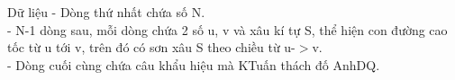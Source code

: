 Dữ liệu  
- Dòng thứ nhất chứa số N.   
\\   - N-1 dòng sau, mỗi dòng chứa 2 số u, v và xâu kí tự S, thể hiện con đường cao tốc từ u tới v, trên đó có sơn xâu S theo chiều từ u-$>$v.   
\\   - Dòng cuối cùng chứa câu khẩu hiệu mà KTuấn thách đố AnhDQ.